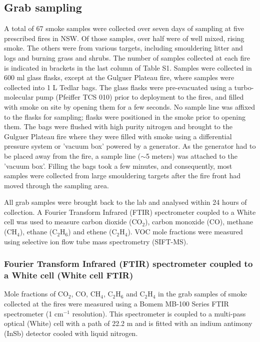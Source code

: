 \documentclass[acp, manuscript]{copernicus}
\begin{document}
\subsection{Grab sampling}
A total of 67 smoke samples were collected over seven days of sampling at five prescribed fires in NSW. Of those samples, over half were of well mixed, rising smoke. The others were from various targets, including smouldering litter and logs and burning grass and shrubs. The number of samples collected at each fire is indicated in brackets in the last column of Table S1. 
Samples were collected in 600 ml glass flasks, except at the Gulguer Plateau fire, where samples were collected into 1 L Tedlar bags. The glass flasks were pre-evacuated using a turbo-molecular pump (Pfeiffer TCS 010) prior to deployment to the fires, and filled with smoke on site by opening them for a few seconds. No sample line was affixed to the flasks for sampling; flasks were positioned in the smoke prior to opening them. The bags were flushed with high purity nitrogen and brought to the Gulguer Plateau fire where they were filled with smoke using a differential pressure system or 'vacuum box' powered by a generator. As the generator had to be placed away from the fire, a sample line ($\sim$5 meters) was attached to the 'vacuum box'. Filling the bags took a few minutes, and consequently, most samples were collected from large smouldering targets after the fire front had moved through the sampling area. 

All grab samples were brought back to the lab and analysed within 24 hours of collection. A Fourier Transform Infrared (FTIR) spectrometer coupled to a White cell was used to measure carbon dioxide (CO$_2$), carbon monoxide (CO), methane (CH$_4$), ethane (C$_2$H$_6$) and ethene (C$_2$H$_4$). VOC mole fractions were measured using selective ion flow tube mass spectrometry (SIFT-MS).


\subsubsection{Fourier Transform Infrared (FTIR) spectrometer coupled to a White cell (White cell FTIR)}
Mole fractions of CO$_2$, CO, CH$_4$, C$_2$H$_6$ and C$_2$H$_4$ in the grab samples of smoke collected at the fires were measured using a Bomem MB-100 Series FTIR spectrometer (1 cm$^{-1}$ resolution). This spectrometer is coupled to a multi-pass optical (White) cell with a path of 22.2 m and is fitted with an indium antimony (InSb) detector cooled with liquid nitrogen. 
\end{document}
